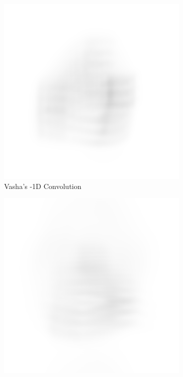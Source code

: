 \documentclass{article}
\begin{document}
\begin{figure}[H]
\begin{subfigure}{.3\textwidth}
  \centering
  \includegraphics[width=1\linewidth]{Vasha_R_G_0530_2_500_zer_-1_5_PSF_convE.png}
  \caption{Vasha's -1D Convolution}
  \label{fig:vashan1d}
\end{subfigure}
\begin{subfigure}{.3\textwidth}
  \centering
  \includegraphics[width=1\linewidth]{Liz_R_G_0523_2_500_zer_-1_5_PSF_convE.png}

\end{subfigure}
\end{figure}
\end{document}
